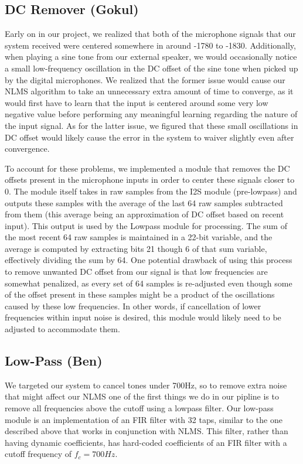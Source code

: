 \documentclass{fpgairpods}
\begin{document}
\subsection{DC Remover (Gokul)}
Early on in our project, we realized that both of the microphone signals that our system received were centered somewhere in around -1780 to -1830. Additionally, when playing a sine tone from our external speaker, we would occasionally notice a small low-frequency oscillation in the DC offset of the sine tone when picked up by the digital microphones. We realized that the former issue would cause our NLMS algorithm to take an unnecessary extra amount of time to converge, as it would first have to learn that the input is centered around some very low negative value before performing any meaningful learning regarding the nature of the input signal. As for the latter issue, we figured that these small oscillations in DC offset would likely cause the error in the system to waiver slightly even after convergence.

To account for these problems, we implemented a module that removes the DC offsets present in the microphone inputs in order to center these signals closer to 0. The module itself takes in raw samples from the I2S module (pre-lowpass) and outputs these samples with the average of the last 64 raw samples subtracted from them (this average being an approximation of DC offset based on recent input). This output is used by the Lowpass module for processing. The sum of the most recent 64 raw samples is maintained in a 22-bit variable, and the average is computed by extracting bits 21 though 6 of that sum variable, effectively dividing the sum by 64. One potential drawback of using this process to remove unwanted DC offset from our signal is that low frequencies are somewhat penalized, as every set of 64 samples is re-adjusted even though some of the offset present in these samples might be a product of the oscillations caused by these low frequencies. In other words, if cancellation of lower frequencies within input noise is desired, this module would likely need to be adjusted to accommodate them.

\subsection{Low-Pass (Ben)}
We targeted our system to cancel tones under 700Hz, so to remove extra noise that might affect our NLMS one of the first things we do in our pipline is to remove all frequencies above the cutoff using a lowpass filter. Our low-pass module is an implementation of an FIR filter with 32 taps, similar to the one described above that works in conjunction with NLMS. This filter, rather than having dynamic coefficients, has hard-coded coefficients of an FIR filter with a cutoff frequency of $f_c = 700Hz$.
\end{document}
